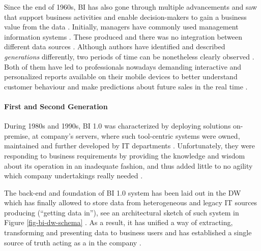 Since the end of 1960s, \ac{BI} has also gone through multiple advancements and saw  that support business activities and enable decision-makers to gain a business value from the data \parencite[342]{Shollo2016TowardsKnowing}.
Initially, managers have commonly used management information systems \parencites{realTimeBIContinental2006}{Shollo2016TowardsKnowing}{ArnottDAvidBIPat2017}.
These produced  and there was no integration between different data sources \parencites[342]{Shollo2016TowardsKnowing}{Larson2016AScience}. 
Although authors have identified and described \emph{generations} differently, two periods of time can be nonetheless clearly observed \parencites{Brian2015Gent}{Kohl2016}. 
Both of them have led to professionals nowadays demanding interactive and personalized reports available on their mobile devices to better understand customer behaviour and make predictions about future sales in the real time \parencites{Wilkerson2016CISB5941}{Boris2015}{2015arXiv151103085K}.

\paragraph*{First and Second Generation}
During 1980s and 1990s, \ac{BI} 1.0 was characterized by deploying solutions on-premise, at company's servers, where such tool-centric systems were owned, maintained and further developed by \ac{IT} departments \parencite{Kohl2016}.
Unfortunately, they were responding to business requirements by providing the knowledge and wisdom about its operation in an inadequate fashion, and thus added little to no agility which company undertakings really needed \parencite{Chen2012}.

The back-end and foundation of \ac{BI} 1.0 system has been laid out in the \ac{DW} which has finally allowed to store data from heterogeneous and legacy \ac{IT} sources producing  (\enquote{getting data in}), see an architectural sketch of such system in Figure \ref{fig-bi-dw-schema} \parencites[704]{Larson2016AScience}{Hejdanek2016NavrhIntelligencequot}{WatsonBiDatagettingIN2007}.
As a result, it has unified a way of extracting, transforming and presenting data to business users and has established a single source of truth acting as a  in the company \parencites{Heinze2014HistoryIntelligence}{Negash2008}{WarrenThornthwaite2012MicrosoftApproach}.

